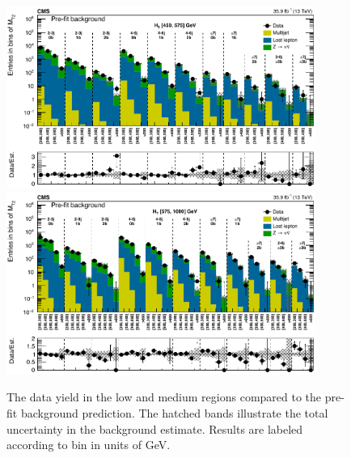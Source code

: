 \begin{figure}
	\centering
	\includegraphics[width=0.90\textwidth]{results/figs/mt2_lowHT_fullEstimate}
	\includegraphics[width=0.90\textwidth]{results/figs/mt2_mediumHT_fullEstimate}
	\caption{The data yield in the low \HT and medium \HT regions compared to the pre-fit background prediction. The hatched bands illustrate the total uncertainty in the background estimate. Results are labeled according to \mttwo bin in units of GeV.}
	\label{fig:yieldPrefit2}
\end{figure}
